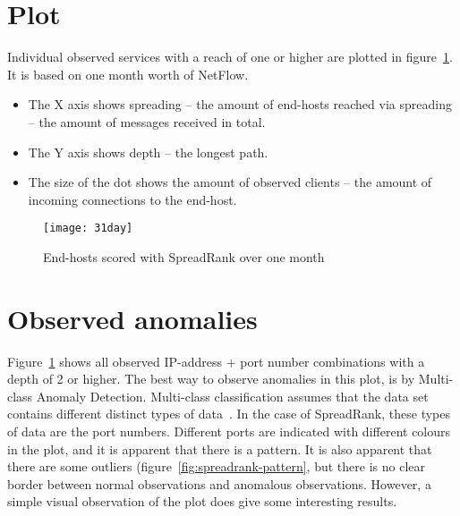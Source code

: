 \section{Plot}
Individual observed services with a reach of one or higher are plotted in figure~\ref{fig:31day}.
It is based on one month worth of NetFlow.

\begin{itemize}
\item The X axis shows \gls{spreading} -- the amount of end-hosts reached via spreading -- the amount of messages received in total.
\item The Y axis shows \gls{depth} -- the longest path.
\item The size of the dot shows the amount of observed \gls{client}s -- the amount of incoming connections to the end-host.
\end{itemize}

\begin{figure}[h!]
	\caption{End-hosts scored with SpreadRank over one month}
	\label{fig:31day}
	\centering
		\texttt{[image: 31day]}
\end{figure}


\section{Observed anomalies}
Figure~\ref{fig:31day} shows all observed IP-address + port number combinations with a depth of 2 or higher.
The best way to observe anomalies in this plot, is by Multi-class Anomaly Detection.
Multi-class classification assumes that the data set contains different distinct types of data~\cite{Chandola:2009:ADS:1541880.1541882}.
In the case of SpreadRank, these types of data are the port numbers.
Different ports are indicated with different colours in the plot, and it is apparent that there is a pattern.
It is also apparent that there are some outliers (figure~\ref{fig:spreadrank-pattern}, but there is no clear border between normal observations and anomalous observations.
However, a simple visual observation of the plot does give some interesting results.

